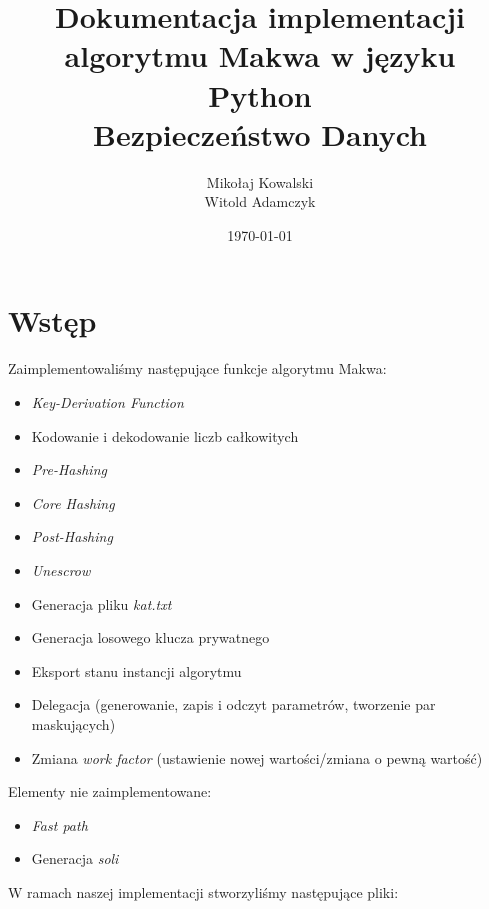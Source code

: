 \documentclass[a4paper,titleauthor]{mwart}
\title{Dokumentacja implementacji algorytmu Makwa w języku Python \\ Bezpieczeństwo Danych}
\author{Mikołaj Kowalski\\Witold Adamczyk}
\affil{Politechnika Warszawska, Instytut Telekomunikacji}
\date{\today}
\begin{document}
	
\maketitle



\tableofcontents
\section{Wstęp}
Zaimplementowaliśmy następujące funkcje algorytmu Makwa:
\begin{itemize}
	\item \textit{Key-Derivation Function}
	\item Kodowanie i dekodowanie liczb całkowitych
	\item \textit{Pre-Hashing}
	\item \textit{Core Hashing}
	\item \textit{Post-Hashing}
	\item \textit{Unescrow}
	\item Generacja pliku \textit{kat.txt}
	\item Generacja losowego klucza prywatnego
	\item Eksport stanu instancji algorytmu
	\item Delegacja (generowanie, zapis i odczyt parametrów, tworzenie par maskujących)
	\item Zmiana \textit{work factor} (ustawienie nowej wartości/zmiana o pewną wartość)
\end{itemize}
Elementy nie zaimplementowane:
\begin{itemize}
	\item \textit{Fast path}
	\item Generacja \textit{soli}
\end{itemize}
W ramach naszej implementacji stworzyliśmy następujące pliki:
\end{document}
